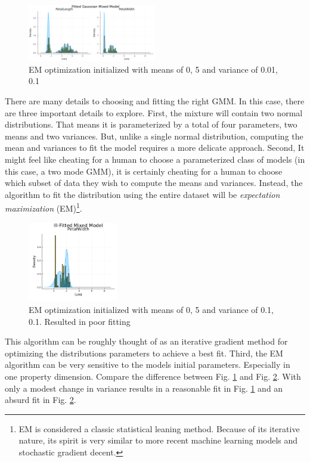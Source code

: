 \begin{figure}
\centering
    \includegraphics[width=0.5\textwidth]{Code/propHist2x1_OverTot.png}
    \caption{EM optimization initialized with means of 0, 5 and variance of 0.01, 0.1}
    \label{fig:propHist2x1_OverTot}
\end{figure}
There are many details to choosing and fitting the right GMM. In this case, there are three important details to explore. First, the mixture will contain two normal distributions. That means it is parameterized by a total of four parameters, two means and two variances. But, unlike a single normal distribution, computing the mean and variances to fit the model requires a more delicate approach. Second, It might feel like cheating for a human to choose a parameterized class of models (in this case, a two mode GMM), it is certainly cheating for a human to choose which subset of data they wish to compute the means and variances. Instead, the algorithm to fit the distribution using the entire dataset will be \emph{expectation maximization} (EM)\footnote{EM is considered a classic statistical leaning method. Because of its iterative nature, its spirit is very similar to more recent machine learning models and stochastic gradient decent.}.
\begin{figure}
\centering
    \includegraphics[width=0.35\textwidth]{Code/propHist2x1_OverTot_bad.png}
    \caption{EM optimization initialized with means of 0, 5 and variance of 0.1, 0.1. Resulted in poor fitting }
    \label{fig:propHist2x1_OverTot_bad}
\end{figure}
This algorithm can be roughly thought of as an iterative gradient method for optimizing the distributions parameters to achieve a best fit. Third, the EM algorithm can be very sensitive to the models initial parameters. Especially in one property dimension. Compare the difference between Fig. \ref{fig:propHist2x1_OverTot} and Fig. \ref{fig:propHist2x1_OverTot_bad}. With only a modest change in variance results in a reasonable fit in Fig. \ref{fig:propHist2x1_OverTot} and an absurd fit in Fig. \ref{fig:propHist2x1_OverTot_bad}.

